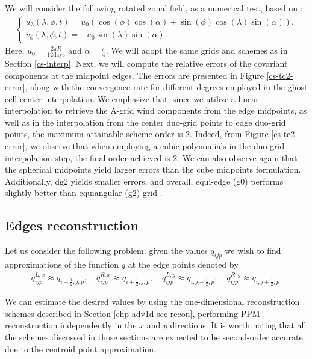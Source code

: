 We will consider the following rotated zonal field, as a numerical test, based on \citet{will:1992}:
\begin{align}
	\label{duo-wind1}
	\begin{cases}
		u_\lambda(\lambda,\phi,t) = u_0(\cos(\phi)\cos(\alpha) + \sin(\phi)\cos(\lambda)\sin(\alpha)),\\
		v_\phi(\lambda,\phi,t) = -u_0\sin(\lambda)\sin(\alpha).
	\end{cases}
\end{align}
Here,  $u_0 = \frac{2\pi R}{12 \text{days}}$ and $\alpha= \frac{\pi}{4}$. We will adopt the same grids and schemes as in Section \ref{cs-interp}.
Next, we will compute the relative errors of the covariant components at the midpoint edges.
The errors are presented in Figure \ref{cs-tc2-error}, along with the convergence rate for different degrees employed in the ghost cell center interpolation.
We emphasize that, since we utilize a linear interpolation to retrieve the A-grid wind components from the edge midpoints, as well as in the interpolation
from the center duo-grid points to edge duo-grid points, the maximum attainable scheme order is 2.
Indeed, from Figure \ref{cs-tc2-error}, we observe that when employing a cubic polynomials in the duo-grid interpolation step, the final order achieved is 2.
We can also observe again that the spherical midpoints yield larger errors than the cube midpoints formulation.
Additionally, dg2 yields smaller errors, and overall, equi-edge (g0) performs slightly better than equiangular (g2) grid .


\newpage
\subsection{Edges reconstruction}
\label{cs-recon}
Let us consider the following problem: given the values $q_{ijp}$ we wish to find 
approximations of the function $q$ at the edge points denoted by
\begin{align*}
	q^{L,x}_{ijp}  \approx q_{{i-\frac{1}{2}},j,p},\quad
	q^{R,x}_{ijp}  \approx q_{{i+\frac{1}{2}},j,p},\quad
	q^{L,y}_{ijp}  \approx q_{i,{j-\frac{1}{2}},p},\quad
	q^{R,y}_{ijp}  \approx q_{i,{j+\frac{1}{2}},p}.
\end{align*}

We can estimate the desired values by using the one-dimensional reconstruction schemes 
described in Section \ref{chp-adv1d-sec-recon},
performing PPM reconstruction independently in the $x$ and $y$ directions. 
It is worth noting that all the schemes discussed in those sections are 
expected to be second-order accurate due to the centroid point approximation.

